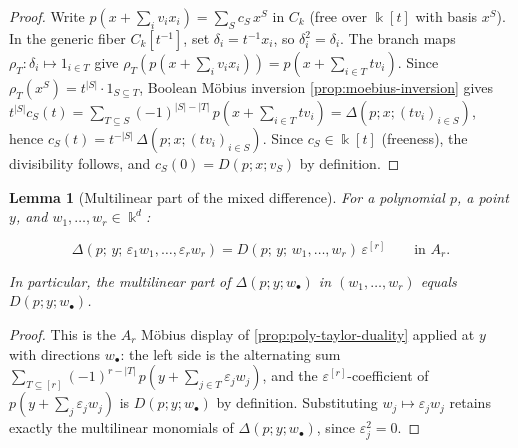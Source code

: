 \documentclass[10pt,a4paper]{article}
\theoremstyle{plain}
\newtheorem{lemma}[theorem]{Lemma}
\theoremstyle{definition}
\newcommand{\ik}{\Bbbk} %
\newcommand{\1}{\mathbb{1}} %
\newcommand{\eps}{\varepsilon} %
\begin{document}
\begin{proof}

Write \(p(x + \sum_i v_i x_i) = \sum_S c_S\, x^S\) in \(C_k\) (free over
\(\ik[t]\) with basis \(x^S\)). In the generic fiber \(C_k[t^{-1}]\),
set \(\delta_i = t^{-1} x_i\), so \(\delta_i^2 = \delta_i\). The branch
maps \(\rho_T: \delta_i \mapsto 1_{i \in T}\) give
\(\rho_T(p(x + \sum_i v_i x_i)) = p(x + \sum_{i \in T} tv_i)\). Since
\(\rho_T(x^S) = t^{|S|} \cdot 1_{S \subseteq T}\), Boolean Möbius
inversion \ref{prop:moebius-inversion} gives
\(t^{|S|} c_S(t) = \sum_{T \subseteq S} (-1)^{|S|-|T|}\, p(x + \sum_{i \in T} tv_i) = \Delta(p; x; (tv_i)_{i \in S})\),
hence \(c_S(t) = t^{-|S|}\, \Delta(p; x; (tv_i)_{i \in S})\). Since
\(c_S \in \ik[t]\) (freeness), the divisibility follows, and
\(c_S(0) = D(p; x; v_S)\) by definition.

\end{proof}

\begin{lemma}[Multilinear part of the mixed difference]

\label{lem:multilinear-part} For a polynomial \(p\), a point \(y\), and
\(w_1, \dots, w_r \in \ik^d\):

\[
  \Delta(p;\, y;\, \eps_1 w_1, \dots, \eps_r w_r) = D(p;\, y;\, w_1, \dots, w_r)\, \eps^{[r]} \qquad \text{in } A_r.
\]

In particular, the multilinear part of \(\Delta(p; y; w_\bullet)\) in
\((w_1, \dots, w_r)\) equals \(D(p; y; w_\bullet)\).

\end{lemma}

\begin{proof}

This is the \(A_r\) Möbius display of \ref{prop:poly-taylor-duality}
applied at \(y\) with directions \(w_\bullet\): the left side is the
alternating sum
\(\sum_{T \subseteq [r]} (-1)^{r-|T|}\, p(y + \sum_{j \in T} \eps_j w_j)\),
and the \(\eps^{[r]}\)-coefficient of \(p(y + \sum_j \eps_j w_j)\) is
\(D(p; y; w_\bullet)\) by definition. Substituting
\(w_j \mapsto \eps_j w_j\) retains exactly the multilinear monomials of
\(\Delta(p; y; w_\bullet)\), since \(\eps_j^2 = 0\).

\end{proof}
\end{document}
